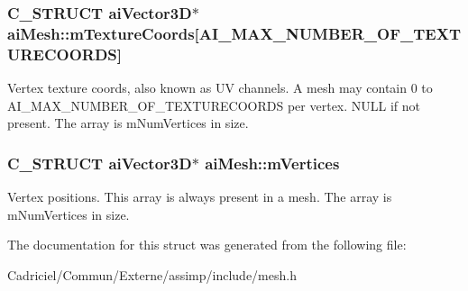 \subsubsection[{\texorpdfstring{m\+Texture\+Coords}{mTextureCoords}}]{\setlength{\rightskip}{0pt plus 5cm}C\+\_\+\+S\+T\+R\+U\+CT {\bf ai\+Vector3D}$\ast$ ai\+Mesh\+::m\+Texture\+Coords\mbox{[}A\+I\+\_\+\+M\+A\+X\+\_\+\+N\+U\+M\+B\+E\+R\+\_\+\+O\+F\+\_\+\+T\+E\+X\+T\+U\+R\+E\+C\+O\+O\+R\+DS\mbox{]}}\hypertarget{structai_mesh_a4a50b11d00ef50f419c75cab0f6bddd6}{}\label{structai_mesh_a4a50b11d00ef50f419c75cab0f6bddd6}
Vertex texture coords, also known as UV channels. A mesh may contain 0 to A\+I\+\_\+\+M\+A\+X\+\_\+\+N\+U\+M\+B\+E\+R\+\_\+\+O\+F\+\_\+\+T\+E\+X\+T\+U\+R\+E\+C\+O\+O\+R\+DS per vertex. N\+U\+LL if not present. The array is m\+Num\+Vertices in size. 
\subsubsection[{\texorpdfstring{m\+Vertices}{mVertices}}]{\setlength{\rightskip}{0pt plus 5cm}C\+\_\+\+S\+T\+R\+U\+CT {\bf ai\+Vector3D}$\ast$ ai\+Mesh\+::m\+Vertices}\hypertarget{structai_mesh_afd4588abb3e1c72821ae0234a3850662}{}\label{structai_mesh_afd4588abb3e1c72821ae0234a3850662}
Vertex positions. This array is always present in a mesh. The array is m\+Num\+Vertices in size. 

The documentation for this struct was generated from the following file\+:\begin{DoxyCompactItemize}
\item 
Cadriciel/\+Commun/\+Externe/assimp/include/mesh.\+h\end{DoxyCompactItemize}
